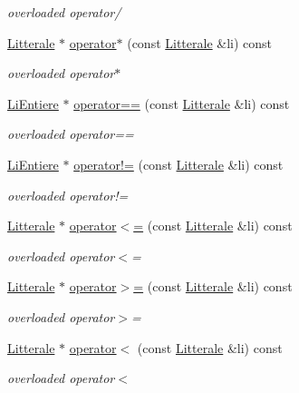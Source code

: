 \begin{DoxyCompactItemize}
\begin{DoxyCompactList}\small\item\em overloaded operator/ \end{DoxyCompactList}\item 
\hyperlink{class_litterale}{Litterale} $\ast$ \hyperlink{class_li_entiere_a976f7f29b27e02770a8efc6278da4255}{operator$\ast$} (const \hyperlink{class_litterale}{Litterale} \&li) const 
\begin{DoxyCompactList}\small\item\em overloaded operator$\ast$ \end{DoxyCompactList}\item 
\hyperlink{class_li_entiere}{Li\+Entiere} $\ast$ \hyperlink{class_li_entiere_a27b8284b91bca5d9113676b7e9fd04d2}{operator==} (const \hyperlink{class_litterale}{Litterale} \&li) const 
\begin{DoxyCompactList}\small\item\em overloaded operator== \end{DoxyCompactList}\item 
\hyperlink{class_li_entiere}{Li\+Entiere} $\ast$ \hyperlink{class_li_entiere_af14a5d2ad57e93da2176d4316e5e2330}{operator!=} (const \hyperlink{class_litterale}{Litterale} \&li) const 
\begin{DoxyCompactList}\small\item\em overloaded operator!= \end{DoxyCompactList}\item 
\hyperlink{class_litterale}{Litterale} $\ast$ \hyperlink{class_li_entiere_a90a3b7b2f1ef1ea18faa50cd7150f141}{operator$<$=} (const \hyperlink{class_litterale}{Litterale} \&li) const 
\begin{DoxyCompactList}\small\item\em overloaded operator$<$= \end{DoxyCompactList}\item 
\hyperlink{class_litterale}{Litterale} $\ast$ \hyperlink{class_li_entiere_af4494bc2dda7b1ff2301b43f19dbc197}{operator$>$=} (const \hyperlink{class_litterale}{Litterale} \&li) const 
\begin{DoxyCompactList}\small\item\em overloaded operator$>$= \end{DoxyCompactList}\item 
\hyperlink{class_litterale}{Litterale} $\ast$ \hyperlink{class_li_entiere_a6446d0a2f619c160cf6a802c531d7d26}{operator$<$} (const \hyperlink{class_litterale}{Litterale} \&li) const 
\begin{DoxyCompactList}\small\item\em overloaded operator$<$ \end{DoxyCompactList}\item 

\end{DoxyCompactItemize}
